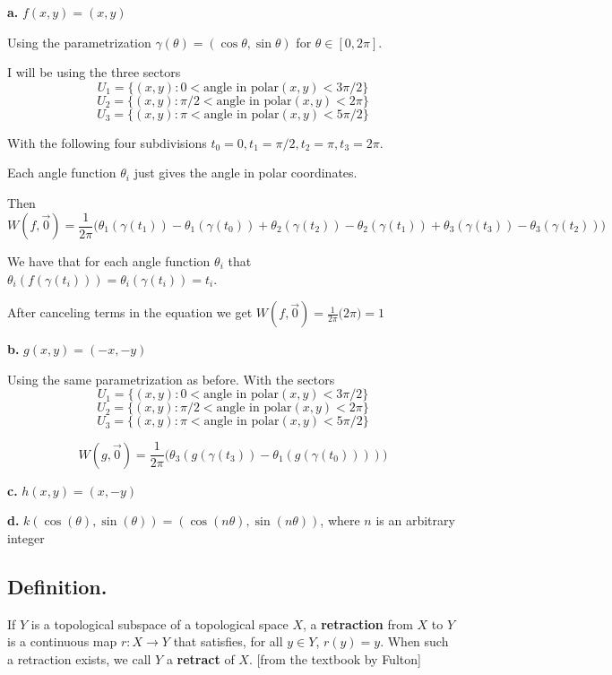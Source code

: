 \documentclass{amsart}
\theoremstyle{plain}
\theoremstyle{definition}
\theoremstyle{remark}
\begin{document}
\vspace{.1in}
{\bfseries a.}  $f(x,y) = (x,y)$
{
Using the parametrization $\gamma(\theta)=(\cos \theta,\sin \theta)$ for $\theta \in [0,2\pi]$. 


I will be using the three sectors  $$U_1=\{(x,y): 0< \text{angle in polar}(x,y)<3\pi/2\}$$  
$$
U_2=\{(x,y): \pi/2 < \text{angle in polar}(x,y)<2\pi\}
$$
$$
U_3=\{(x,y): \pi < \text{angle in polar}(x,y)< 5\pi/2\}
$$

}

With the following four subdivisions $t_0= 0,t_1=\pi/2,t_2=\pi,t_3=2\pi$. 

Each angle function $\theta_i$ just gives the angle in polar coordinates.

Then 
\[
    W(f,\vec 0)=\frac{1}{2\pi}\big(\theta_1(\gamma (t_1))- \theta_1 (\gamma(t_0))+\theta_2(\gamma(t_2))-\theta_2(\gamma(t_1))+\theta_3(\gamma(t_3))-\theta_3(\gamma(t_2))\big)
\]

We have that for each angle function $\theta_i$ that $\theta_i(f(\gamma(t_i)))=\theta_i(\gamma(t_i))=t_i$.

After canceling terms in the equation we get $W(f,\vec 0)=\frac{1}{2\pi}\big(2\pi \big)=1$


\vspace{.1in}
{\bfseries b.} $g(x,y) = (-x,-y)$

{ 
    Using the same parametrization as before. With the sectors $$U_1=\{(x,y): 0< \text{angle in polar}(x,y)<3\pi/2\}$$  
    $$
    U_2=\{(x,y): \pi/2 < \text{angle in polar}(x,y)<2\pi\}
    $$
    $$
    U_3=\{(x,y): \pi < \text{angle in polar}(x,y)< 5\pi/2\}
    $$


    \[
    W(g,\vec 0)=\frac{1}{2\pi}\big(\theta_3(g(\gamma (t_3))-\theta_1(g(\gamma(t_0))))\big)
    \]


}

\vspace{.1in}
{\bfseries c.} $h(x,y) = (x,-y)$

\vspace{.1in}
{\bfseries d.} $k(\cos (\theta ), \sin (\theta )) = (\cos (n\theta ), \sin (n\theta ))$, where $n$ is an arbitrary integer


\vspace{.15in}
\subsection*{Definition.}  If $Y$ is a topological subspace of a topological space $X$, a {\bf retraction} from $X$ to $Y$ is a continuous map $r : X \to Y$ that satisfies, for all $y\in Y$, $r(y) = y$. When such a retraction exists, we call $Y$ a {\bf retract} of $X$. [from the textbook by Fulton]
\end{document}
